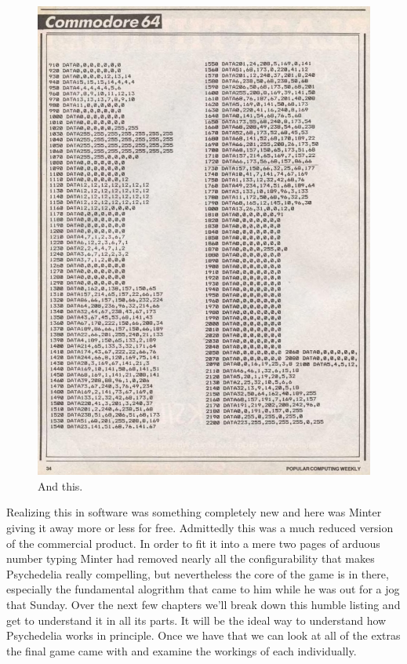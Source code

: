 \begin{figure}[H]
    \centering
    \begin{adjustbox}{width=12cm,center}
      \includegraphics[width=12cm]{src/listing/PopularComputing_Weekly_Issue_1984-12-13_0033.jpg}%
    \end{adjustbox}
\caption{And this.}
\end{figure}

Realizing this in software was something completely new and here was Minter giving it away more or less for free. Admittedly this was
a much reduced version of the commercial product. In order to fit it into a mere two pages of arduous number typing Minter had removed
nearly all the configurability that makes Psychedelia really compelling, but nevertheless the core of the game is in there, especially
the fundamental alogrithm that came to him while he was out for a jog that Sunday. Over the next few chapters we'll break down this
humble listing and get to understand it in all its parts. It will be the ideal way to understand how Psychedelia works in principle.
Once we have that we can look at all of the extras the final game came with and examine the workings of each individually.

